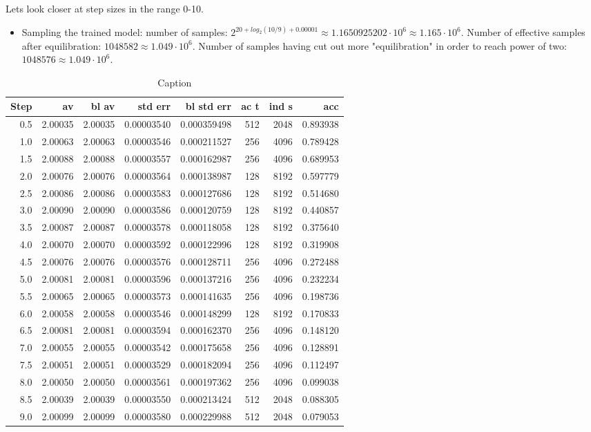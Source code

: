 \documentclass[twoside,english]{uiofysmaster}
\newcommand{\ra}[1]{\renewcommand{\arraystretch}{#1}}
\begin{document}
Lets look closer at step sizes in the range 0-10.
\begin{itemize}
	\item Sampling the trained model: number of samples: $2^{20 + log_2 (10/9) + 0.00001} \approx 1.1650925202\cdot 10^6 \approx 1.165 \cdot 10^6$. Number of effective samples after equilibration: $1048582\approx 1.049 \cdot 10^6$. Number of samples having cut out more "equilibration" in order to reach power of two: $1048576 \approx 1.049 \cdot 10^6$.
\end{itemize}
\begin{table*}\centering
\ra{1.3}
\caption{Caption}
\label{tabsteptest2}
\begin{tabular}{rrrrrrrr}
\toprule
Step & av & bl av & std err & bl std err & ac t & ind s & acc \\ 
\midrule 
0.5 & 2.00035 & 2.00035 & 0.00003540 & 0.000359498 & 512 & 2048 & 0.893938 \\
1.0 & 2.00063 & 2.00063 & 0.00003546 & 0.000211527 & 256 & 4096 & 0.789428 \\
1.5 & 2.00088 & 2.00088 & 0.00003557 & 0.000162987 & 256 & 4096 & 0.689953 \\
2.0 & 2.00076 & 2.00076 & 0.00003564 & 0.000138987 & 128 & 8192 & 0.597779 \\
2.5 & 2.00086 & 2.00086 & 0.00003583 & 0.000127686 & 128 & 8192 & 0.514680 \\
3.0 & 2.00090 & 2.00090 & 0.00003586 & 0.000120759 & 128 & 8192 & 0.440857 \\
3.5 & 2.00087 & 2.00087 & 0.00003578 & 0.000118058 & 128 & 8192 & 0.375640 \\
4.0 & 2.00070 & 2.00070 & 0.00003592 & 0.000122996 & 128 & 8192 & 0.319908 \\
4.5 & 2.00076 & 2.00076 & 0.00003576 & 0.000128711 & 256 & 4096 & 0.272488 \\
5.0 & 2.00081 & 2.00081 & 0.00003596 & 0.000137216 & 256 & 4096 & 0.232234 \\
5.5 & 2.00065 & 2.00065 & 0.00003573 & 0.000141635 & 256 & 4096 & 0.198736 \\
6.0 & 2.00058 & 2.00058 & 0.00003546 & 0.000148299 & 128 & 8192 & 0.170833 \\
6.5 & 2.00081 & 2.00081 & 0.00003594 & 0.000162370 & 256 & 4096 & 0.148120 \\
7.0 & 2.00055 & 2.00055 & 0.00003542 & 0.000175658 & 256 & 4096 & 0.128891 \\
7.5 & 2.00051 & 2.00051 & 0.00003529 & 0.000182094 & 256 & 4096 & 0.112497 \\
8.0 & 2.00050 & 2.00050 & 0.00003561 & 0.000197362 & 256 & 4096 & 0.099038 \\
8.5 & 2.00039 & 2.00039 & 0.00003550 & 0.000213424 & 512 & 2048 & 0.088305 \\
9.0 & 2.00099 & 2.00099 & 0.00003580 & 0.000229988 & 512 & 2048 & 0.079053 \\
\bottomrule
\end{tabular}
\end{table*}
\end{document}
